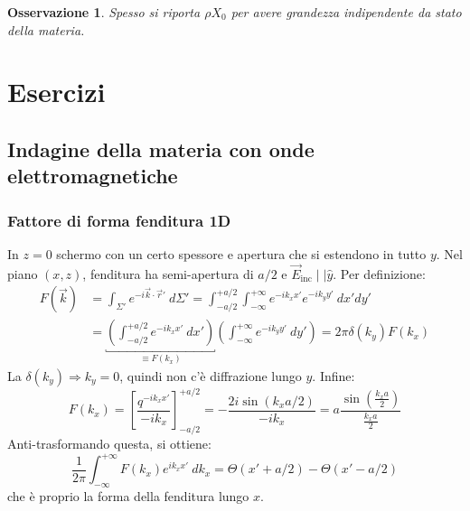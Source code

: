 \documentclass[10pt, a4paper]{scrartcl}
\numberwithin{equation}{subsection}
\theoremstyle{style1}
\newtheorem{osservazione}{Osservazione}[section]
\begin{document}
\begin{osservazione}
	Spesso si riporta $\rho X_0$ per avere grandezza indipendente da stato della materia.
\end{osservazione}















\newpage
\section{Esercizi}

\subsection{Indagine della materia con onde elettromagnetiche}
\subsubsection{Fattore di forma fenditura 1D}
In $z=0$ schermo con un certo spessore e apertura che si estendono in tutto $y$. Nel piano $(x,z)$, fenditura ha semi-apertura di $a / 2$ e $\vec{E}_\text{inc} \mid  \mid \hat{y}$. Per definizione:
\begin{equation}
	\begin{split}
		F(\vec{k}) &= \int_{\Sigma'} e^{-i \vec{k}\cdot \vec{r}'} \ d\Sigma ' = \int_{-a / 2}^{+ a / 2}  \int_{-\infty} ^{+\infty} e^{-ik_x x'} e^{-ik_y y'}  \ dx' dy'\\
			   &= \underbracket{\left(\int_{- a / 2}^{+a / 2}  e^{-i k_x x'} \ dx'\right)}_{\equiv F(k_x)}  \left(\int_{-\infty} ^{+\infty} e^{-ik_y y'}  \ dy'\right) = 2\pi \delta (k_y)F(k_x)
	\end{split}
\end{equation}
La $\delta (k_y) \Rightarrow k_y=0$, quindi non c'\`e diffrazione lungo $y$. Infine:
\begin{equation}
	F(k_x) = \left[ \frac{q^{-ik_x x'} }{-ik_x} \right] ^{+ a / 2} _{- a /2}  = -\frac{2i \sin(k_x a / 2)}{- i k_x}= a\frac{\sin\left(\frac{k_x a }{2}\right) }{\frac{k_x a }{2}}
\end{equation}
Anti-trasformando questa, si ottiene:
\begin{equation}
	\frac{1}{2\pi} \int_{-\infty} ^{+\infty} F(k_x) e^{ik_x x'} \ dk_x= \Theta(x'+ a / 2) - \Theta (x' - a/2)
\end{equation}
che \`e proprio la forma della fenditura lungo $x$.
\end{document}
